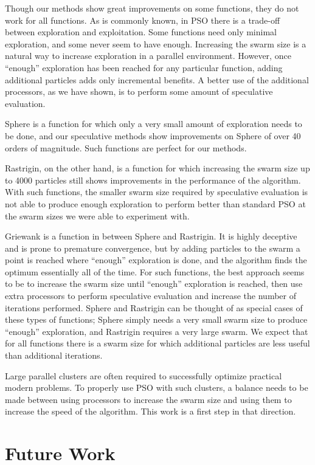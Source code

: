 \documentclass[journal,letterpaper]{IEEEtran}
\begin{document}
Though our methods show great improvements on some functions, they do not work
for all functions.  As is commonly known, in PSO there is a trade-off between
exploration and exploitation.  Some functions need only minimal exploration,
and some never seem to have enough.  Increasing the swarm size is a natural way
to increase exploration in a parallel environment.  However, once ``enough''
exploration has been reached for any particular function, adding additional
particles adds only incremental benefits.  A better use of the additional
processors, as we have shown, is to perform some amount of speculative
evaluation.

Sphere is a function for which only a very small amount of exploration needs to
be done, and our speculative methods show improvements on Sphere of over 40
orders of magnitude.  Such functions are perfect for our methods.

Rastrigin, on the other hand, is a function for which increasing the swarm size
up to 4000 particles still shows improvements in the performance of the
algorithm.  With such functions, the smaller swarm size required by speculative
evaluation is not able to produce enough exploration to perform better than
standard PSO at the swarm sizes we were able to experiment with.

Griewank is a function in between Sphere and Rastrigin.  It is highly deceptive
and is prone to premature convergence, but by adding particles to the swarm a
point is reached where ``enough'' exploration is done, and the algorithm finds
the optimum essentially all of the time.  For such functions, the best approach
seems to be to increase the swarm size until ``enough'' exploration is reached,
then use extra processors to perform speculative evaluation and increase the
number of iterations performed.  Sphere and Rastrigin can be thought of as
special cases of these types of functions; Sphere simply needs a very small
swarm size to produce ``enough'' exploration, and Rastrigin requires a very
large swarm.  We expect that for all functions there is a swarm size for which
additional particles are less useful than additional iterations.

Large parallel clusters are often required to successfully optimize practical
modern problems.  To properly use PSO with such clusters, a balance needs to be
made between using processors to increase the swarm size and using them to
increase the speed of the algorithm.  This work is a first step in that
direction.

\section{Future Work}
\label{sec:future}
\end{document}
